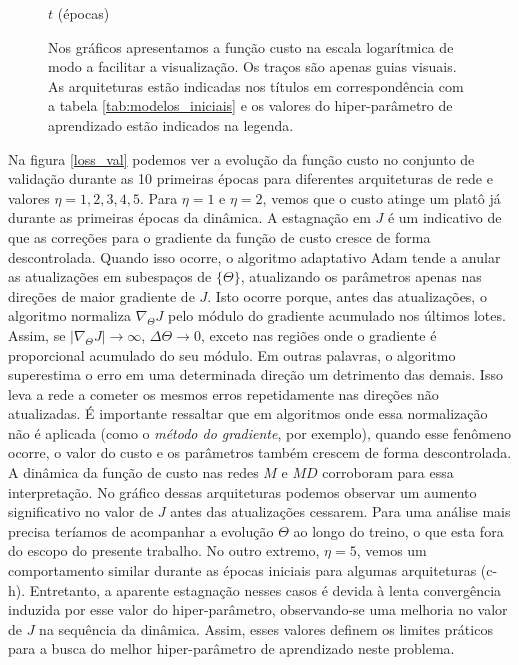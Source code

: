 \begin{figure}[!p]
\begin{center}
\begin{subfigure}{.5\textwidth}
		\end{subfigure}\hfill%
		\newline
		$t$ (épocas)
	\end{center}
	\small Nos gráficos apresentamos a função custo na escala logarítmica de modo a facilitar a visualização. Os traços são apenas guias visuais. As arquiteturas estão indicadas nos títulos em correspondência com a tabela \ref{tab:modelos_iniciais} e os valores do hiper-parâmetro de aprendizado estão indicados na legenda.
\end{figure}

Na figura \ref{loss_val} podemos ver a evolução da função custo no conjunto de validação durante as 10 primeiras épocas para diferentes arquiteturas de rede e valores $\eta=1,2,3,4,5$. Para $\eta=1$ e $\eta=2$, vemos que o custo atinge um platô já durante as primeiras épocas da dinâmica. A estagnação em $J$ é um indicativo de que as correções para o gradiente da função de custo cresce de forma descontrolada. Quando isso ocorre, o algoritmo adaptativo Adam tende a anular as atualizações em subespaços de $\{\Theta\}$, atualizando os parâmetros apenas nas direções de maior gradiente de $J$. Isto ocorre porque, antes das atualizações, o algoritmo normaliza $\nabla_{\Theta} J$ pelo módulo do gradiente acumulado nos últimos lotes. Assim, se $|\nabla_{\Theta} J| \rightarrow \infty$, $\Delta \Theta \rightarrow 0$, exceto nas regiões onde o gradiente é proporcional acumulado do seu módulo. Em outras palavras, o algoritmo superestima o erro em uma determinada direção um detrimento das demais. Isso leva a rede a cometer os mesmos erros repetidamente nas direções não atualizadas. É importante ressaltar que em algoritmos onde essa normalização não é aplicada (como o \textit{método do gradiente}, por exemplo), quando esse fenômeno ocorre, o valor do custo e os parâmetros também crescem de forma descontrolada. A dinâmica da função de custo nas redes $M$ e $MD$ corroboram para essa interpretação. No gráfico dessas arquiteturas podemos observar um aumento significativo no valor de $J$ antes das atualizações cessarem. Para uma análise mais precisa teríamos de acompanhar a evolução $\Theta$ ao longo do treino, o que esta fora do escopo do presente trabalho. No outro extremo, $\eta=5$, vemos um comportamento similar durante as épocas iniciais para algumas arquiteturas (c-h). Entretanto, a aparente estagnação nesses casos é devida à lenta convergência induzida por esse valor do hiper-parâmetro, observando-se uma melhoria no valor de $J$ na sequência da dinâmica. Assim, esses valores definem os limites práticos para a busca do melhor hiper-parâmetro de aprendizado neste problema.

